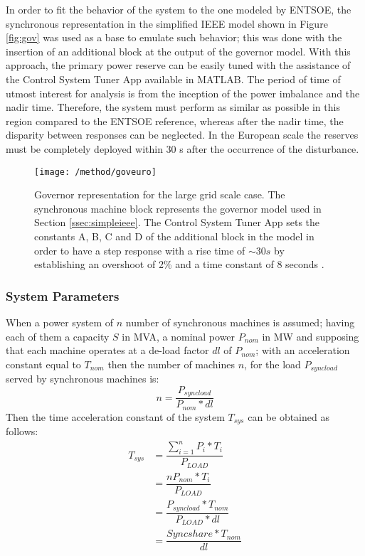 In order to fit the behavior of the system to the one modeled by ENTSOE, the synchronous representation in the simplified IEEE model shown in Figure \ref{fig:gov} was used as a base to emulate such behavior; this was done with the insertion of an additional block at the output of the governor model. With this approach, the primary power reserve can be easily tuned with the assistance of the Control System Tuner App available in MATLAB. The period of time of utmost interest for analysis is from the inception of the power imbalance and the nadir time. Therefore, the system must perform as similar as possible in this region compared to the ENTSOE reference, whereas after the nadir time, the disparity between responses can be neglected. In the European scale the reserves must be completely deployed within 30 s after the occurrence of the disturbance. 

\begin{figure}[h]
	\centering
	\texttt{[image: /method/goveuro]}
	\caption{Governor representation for the large grid scale case. The synchronous machine block represents the governor model used in Section \ref{ssec:simpleieee}. The Control System Tuner App sets the constants A, B, C and D of the additional block in the model in order to have a step response with a rise time of $ \sim30s $ by establishing an overshoot of 2\%  and a time constant of 8 seconds \cite{ogata1999ingenieria}.}
	\label{fig:goveuro}
\end{figure}




\subsubsection{System Parameters}

When a power system of $ n $ number of synchronous machines is assumed; having each of them a capacity $ S $ in MVA, a nominal power $ P_{nom} $ in MW and
supposing that each machine operates at a de-load factor $ dl $ of $ P_{nom} $; with an acceleration constant equal to $ T_{nom} $ then the number of machines $ n $, for the load $ P_{syncload} $ served by synchronous machines is:
\begin{equation}
	n=\dfrac{P_{syncload}}{P_{nom}*dl}
\end{equation}
Then the time acceleration constant of the system $ T_{sys} $ can be obtained as follows:
\begin{align}
	T_{sys} &=\dfrac{\sum_{i=1}^nP_i*T_i}{P_{LOAD}}\nonumber  \\
	 &=\dfrac{nP_{nom}*T_i}{P_{LOAD}}\nonumber \\
	&=\dfrac{P_{syncload}*T_{nom}}{P_{LOAD}*dl}\nonumber\\
		&=\dfrac{Sync share*T_{nom}}{dl} \label{eq:tsyseuro}
\end{align}




